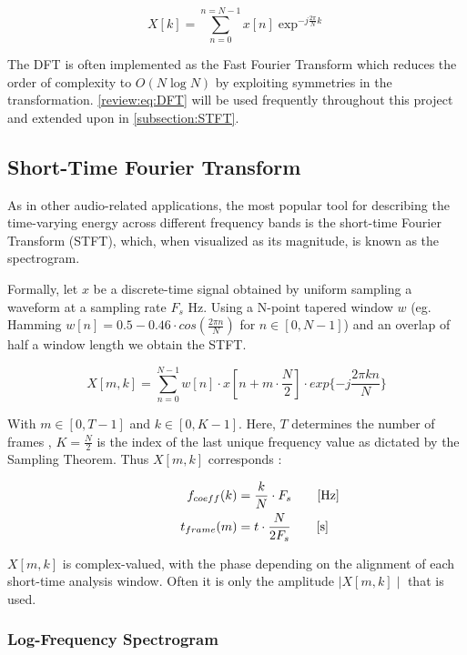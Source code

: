 \begin{equation}
  X[k] =\sum_{n=0}^{n=N-1} x[n] \exp^{-j \frac{2 \pi}{N} k }
  \label{review:eq:DFT}
\end{equation}

The DFT is often implemented as the Fast Fourier Transform which reduces the
order of complexity to $O(N\log{N})$ by exploiting symmetries in the
transformation. \cite{OppenheimDSP} \autoref{review:eq:DFT} will be used
frequently throughout this project and extended upon in
\autoref{subsection:STFT}.

\subsection{Short-Time Fourier Transform}
\label{subsection:STFT}

As in other audio-related applications, the most popular tool for describing the
time-varying energy across different frequency bands is the short-time Fourier
Transform (STFT), which, when visualized as its magnitude, is known as the
spectrogram.

Formally, let $x$ be a discrete-time signal obtained by uniform sampling a
waveform at a sampling rate $F_{s}$ Hz. Using a N-point tapered window $w$ (eg.
Hamming $w[n] = 0.5-0.46\cdot cos(\frac{2\pi n}{N})$ for
$n\in\left[0,N-1\right]$) and an overlap of half a window length we obtain the
STFT.

\begin{equation}
  X [m,k] = \sum_{n=0}^{N-1}w[n]\cdot x[n + m\cdot\frac{N}{2}]\cdot exp\{-j\frac{2\pi k n }{N}\}
\end{equation}

With $m\in\left[0,T-1\right]$ and $k\in\left[0,K-1\right]$. Here, $T$ determines
the number of frames , $K = \frac{N}{2}$ is the index of the last unique
frequency value as dictated by the Sampling Theorem. Thus $X[m,k]$ corresponds :

\begin{align}
  f_{coeff}(k) & = \frac{k}{N} \cdot F_{s} \mathrlap{\qquad [\si{\hertz}]}   \\
  t_{frame}(m) & = t \cdot \frac{N}{2F_{s}} \mathrlap{\qquad [\si{\second}]}
\end{align}

$X[m,k]$ is complex-valued, with the phase depending on the alignment of each
short-time analysis window. Often it is only the amplitude $\mid X[m,k] \mid$
that is used.
\cite{OppenheimDSP}

\subsubsection{Log-Frequency Spectrogram}

